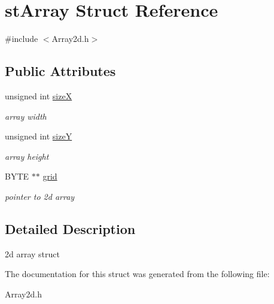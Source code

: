 \hypertarget{structstArray}{
\section{stArray Struct Reference}
\label{structstArray}
}


{\ttfamily \#include $<$Array2d.h$>$}\subsection*{Public Attributes}
\begin{DoxyCompactItemize}
\item 
\hypertarget{structstArray_aec111a22fe648866e9b045a1ad16f6b6}{
unsigned int \hyperlink{structstArray_aec111a22fe648866e9b045a1ad16f6b6}{sizeX}}
\label{structstArray_aec111a22fe648866e9b045a1ad16f6b6}

\begin{DoxyCompactList}\small\item\em array width \item\end{DoxyCompactList}\item 
\hypertarget{structstArray_a5aa2b7473372ebc4ca03f0625f94c124}{
unsigned int \hyperlink{structstArray_a5aa2b7473372ebc4ca03f0625f94c124}{sizeY}}
\label{structstArray_a5aa2b7473372ebc4ca03f0625f94c124}

\begin{DoxyCompactList}\small\item\em array height \item\end{DoxyCompactList}\item 
\hypertarget{structstArray_a72bf892949527beffe2f292a5b53d4cf}{
BYTE $\ast$$\ast$ \hyperlink{structstArray_a72bf892949527beffe2f292a5b53d4cf}{grid}}
\label{structstArray_a72bf892949527beffe2f292a5b53d4cf}

\begin{DoxyCompactList}\small\item\em pointer to 2d array \item\end{DoxyCompactList}\end{DoxyCompactItemize}


\subsection{Detailed Description}
2d array struct 

The documentation for this struct was generated from the following file:\begin{DoxyCompactItemize}
\item 
Array2d.h\end{DoxyCompactItemize}
